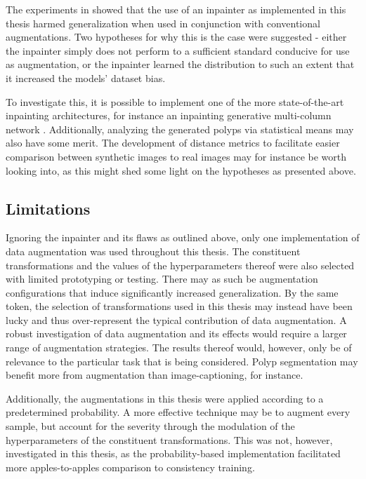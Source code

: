 The experiments in  showed that the use of an inpainter as implemented in this thesis harmed generalization when used in conjunction with conventional augmentations. Two hypotheses for why this is the case were suggested - either the inpainter simply does not perform to a sufficient standard conducive for use as augmentation, or the inpainter learned the distribution to such an extent that it increased the models' dataset bias. 

To investigate this, it is possible to implement one of the more state-of-the-art inpainting architectures, for instance an inpainting generative multi-column network \cite{inpainter_better}. Additionally, analyzing the generated polyps via statistical means may also have some merit. The development of distance metrics to facilitate easier comparison between synthetic images to real images may for instance be worth looking into, as this might shed some light on the hypotheses as presented above.

\subsection{Limitations}
    Ignoring the inpainter and its flaws as outlined above, only one implementation of data augmentation was used throughout this thesis. The constituent transformations and the values of the hyperparameters thereof were also selected with limited prototyping or testing. There may as such be augmentation configurations that induce significantly increased generalization. By the same token, the selection of transformations used in this thesis may instead have been lucky and thus over-represent the typical contribution of data augmentation. A robust investigation of data augmentation and its effects would require a larger range of augmentation strategies. The results thereof would, however, only be of relevance to the particular task that is being considered. Polyp segmentation may benefit more from augmentation than image-captioning, for instance. 
    
    Additionally, the augmentations in this thesis were applied according to a predetermined probability. A more effective technique may be to augment every sample, but account for the severity through the modulation of the hyperparameters of the constituent transformations. This was not, however, investigated in this thesis, as the probability-based implementation facilitated more apples-to-apples comparison to consistency training. 

